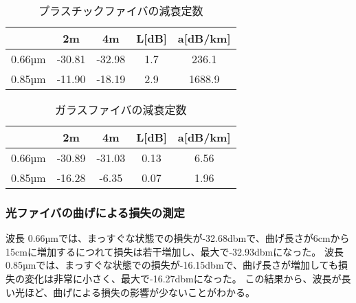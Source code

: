 \documentclass[a4paper,11pt,xelatex,ja=standard]{bxjsarticle}
\begin{document}
            \begin{center}
                \begin{table}[H]
                    \caption{プラスチックファイバの減衰定数}
                    \centering
                    \begin{tabular}{|c|c|c|c|c|}
                        \hline
                        & 2m & 4m & L[dB] & a[dB/km] \\
                        \hline
                        0.66µm & -30.81 & -32.98 & 1.7 & 236.1 \\
                        \hline
                        0.85µm & -11.90 & -18.19 & 2.9 & 1688.9 \\
                        \hline
                    \end{tabular}
                \end{table}
            \end{center}
            
            \begin{center}
                \begin{table}[H]
                    \caption{ガラスファイバの減衰定数}
                    \centering
                    \begin{tabular}{|c|c|c|c|c|}
                        \hline
                        & 2m & 4m & L[dB] & a[dB/km] \\
                        \hline
                        0.66µm & -30.89 & -31.03 & 0.13 & 6.56 \\
                        \hline
                        0.85µm & -16.28 & -6.35 & 0.07 & 1.96 \\
                        \hline
                    \end{tabular}
                \end{table}
            \end{center}

        \subsubsection{光ファイバの曲げによる損失の測定}
            波長 0.66µmでは、まっすぐな状態での損失が-32.68dbmで、曲げ長さが6cmから15cmに増加するにつれて損失は若干増加し、最大で-32.93dbmになった。
            波長 0.85µmでは、まっすぐな状態での損失が-16.15dbmで、曲げ長さが増加しても損失の変化は非常に小さく、最大で-16.27dbmになった。
            この結果から、波長が長い光ほど、曲げによる損失の影響が少ないことがわかる。
\end{document}
